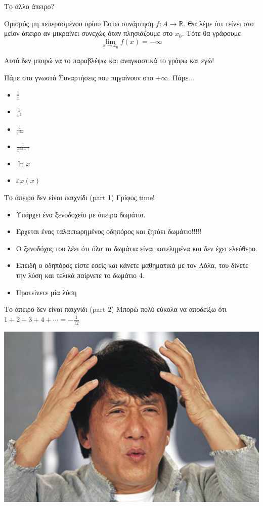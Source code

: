 \documentclass[greek]{beamer}
\begin{document}
\begin{frame}{Το άλλο άπειρο?}
 \begin{block}{Ορισμός μη πεπερασμένου ορίου}
  Έστω συνάρτηση $f:Α\to\mathbb{R}$. Θα λέμε ότι τείνει στο μείον άπειρο αν μικραίνει συνεχώς όταν πλησιάζουμε στο $x_0$. Τότε θα γράφουμε
  $$\lim\limits_{x \to x_0}{ f(x) }=-\infty$$
 \end{block} \pause
 Αυτό δεν μπορώ να το παραβλέψω και αναγκαστικά το γράφω και εγώ!
\end{frame}

\begin{frame}{Πάμε στα γνωστά}
 Συναρτήσεις που πηγαίνουν στο $+\infty$. \pause Πάμε... \pause
 \begin{itemize}
  \item $\frac{1}{x}$
  \item $\frac{1}{x^2}$
  \item $\frac{1}{x^{2k}}$
  \item $\frac{1}{x^{2k+1}}$
  \item $\ln{x}$
  \item $εφ(x)$
 \end{itemize}
\end{frame}

\begin{frame}{Το άπειρο δεν είναι παιχνίδι (part 1)}
Γρίφος time!
  \begin{itemize}
   \item Υπάρχει ένα ξενοδοχείο με άπειρα δωμάτια.
   \item Έρχεται ένας ταλαιπωρημένος οδηπόρος και ζητάει δωμάτιο!!!!!
   \item Ο ξενοδόχος του λέει ότι όλα τα δωμάτια είναι κατελημένα και δεν έχει ελεύθερο.
   \item Επειδή ο οδηπόρος είστε εσείς και κάνετε μαθηματικά με τον Λόλα, του δίνετε την λύση και τελικά παίρνετε το δωμάτιο 4.
   \item Προτείνετε μία λύση
  \end{itemize}
\end{frame}

\begin{frame}{Το άπειρο δεν είναι παιχνίδι (part 2)}
Μπορώ πολύ εύκολα να αποδείξω ότι $1+2+3+4+\cdots = -\frac{1}{12}$

 \centering
 \includegraphics[height=0.4\columnwidth]{images/qiev6}
\end{frame}
\end{document}
